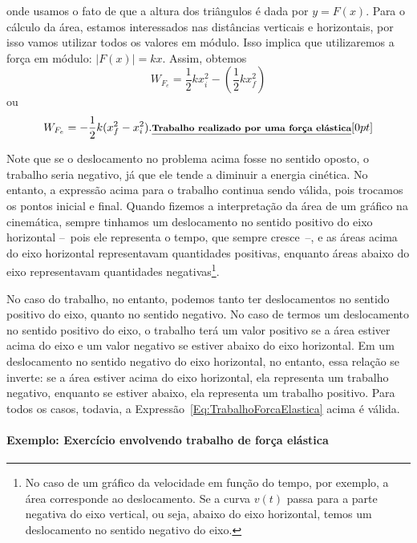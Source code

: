 \noindent{}onde usamos o fato de que a altura dos triângulos é dada por $y = F(x)$. Para o cálculo da área, estamos interessados nas distâncias verticais e horizontais, por isso vamos utilizar todos os valores em módulo. Isso implica que utilizaremos a força em módulo: $|F(x)| = kx$. Assim, obtemos
\begin{equation}
  W_{F_e} = \frac{1}{2} k x_i^2 - \left(\frac{1}{2} k x_f^2 \right)
\end{equation}
%
ou
\begin{equation}\label{Eq:TrabalhoForcaElastica}
  W_{F_e} = - \frac{1}{2} k (x_f^2 - x_i^2). \relax{\footnotesize\emph{\textbf{Trabalho realizado por uma força elástica}}}[0pt]
\end{equation}

Note que se o deslocamento no problema acima fosse no sentido oposto, o trabalho seria negativo, já que ele tende a diminuir a energia cinética. No entanto, a expressão acima para o trabalho continua sendo válida, pois trocamos os pontos inicial e final. Quando fizemos a interpretação da área de um gráfico na cinemática, sempre tinhamos um deslocamento no sentido positivo do eixo horizontal --~pois ele representa o tempo, que sempre cresce~--, e as áreas acima do eixo horizontal representavam quantidades positivas, enquanto áreas abaixo do eixo representavam quantidades negativas\footnote{No caso de um gráfico da velocidade em função do tempo, por exemplo, a área corresponde ao deslocamento. Se a curva $v(t)$ passa para a parte negativa do eixo vertical, ou seja, abaixo do eixo horizontal, temos um deslocamento no sentido negativo do eixo.}.

No caso do trabalho, no entanto, podemos tanto ter deslocamentos no sentido positivo do eixo, quanto no sentido negativo. No caso de termos um deslocamento no sentido positivo do eixo, o trabalho terá um valor positivo se a área estiver acima do eixo e um valor negativo se estiver abaixo do eixo horizontal. Em um deslocamento no sentido negativo do eixo horizontal, no entanto, essa relação se inverte: se a área estiver acima do eixo horizontal, ela representa um trabalho negativo, enquanto se estiver abaixo, ela representa um trabalho positivo. Para todos os casos, todavia, a Expressão~\eqref{Eq:TrabalhoForcaElastica} acima é válida.

\paragraph{Exemplo: Exercício envolvendo trabalho de força elástica}

